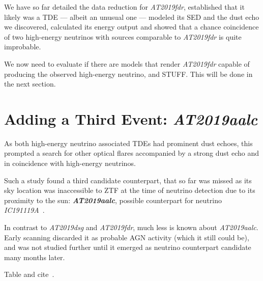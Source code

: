 We have so far detailed the data reduction for \emph{AT2019fdr}, established that it likely was a TDE --- albeit an unusual one --- modeled its SED and the dust echo we discovered, calculated its energy output and showed that a chance coincidence of two high-energy neutrinos with sources comparable to \emph{AT2019fdr} is quite improbable.

We now need to evaluate if there are models that render \emph{AT2019fdr} capable of producing the observed high-energy neutrino, and STUFF. This will be done in the next section.

\section{Adding a Third Event: \textit{AT2019aalc}}
As both high-energy neutrino associated TDEs had prominent dust echoes, this prompted a search for other optical flares accompanied by a strong dust echo and in coincidence with high-energy neutrinos.

Such a study found a third candidate counterpart, that so far was missed as its sky location was inaccessible to ZTF at the time of neutrino detection due to its proximity to the sun: \textbf{\textit{AT2019aalc}}, possible counterpart for neutrino \textit{IC191119A}~\cite{Velzen2021}.

In contrast to \textit{AT2019dsg} and \textit{AT2019fdr}, much less is known about \textit{AT2019aalc}. Early scanning discarded it as probable AGN activity (which it still could be), and was not studied further until it emerged as neutrino counterpart candidate many months later.

Table and cite~.